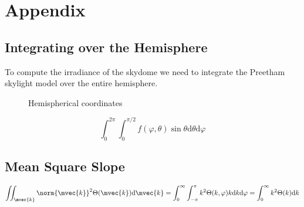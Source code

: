 \chapter{Appendix}
\section{Integrating over the Hemisphere}
To compute the irradiance of the skydome we need to integrate the Preetham skylight
model over the entire hemisphere.

\begin{figure}
\centering
\def\svgwidth{0.5\textwidth}

\caption{Hemispherical coordinates}
\end{figure}

\begin{equation}
\int_{0}^{2\pi}\int_{0}^{\pi/2} f(\varphi,\theta) \sin{\theta}\mathrm{d}\theta\mathrm{d}\varphi
\end{equation}
\section{Mean Square Slope}
\begin{equation}
\iint_{\mvec{k}} \norm{\mvec{k}}^2 \Theta(\mvec{k}) \mathrm{d}\mvec{k} = \int_{0}^{\infty} \int_{-\pi}^{\pi} k^2 \Theta(k,\varphi) k \mathrm{d}k\mathrm{d}\varphi =  \int_{0}^{\infty}k^2 \Theta(k)\mathrm{d}k
\end{equation}
